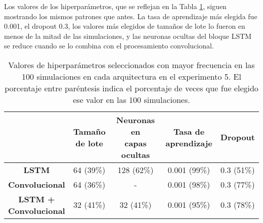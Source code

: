 \documentclass[../../main.tex]{subfiles}
\begin{document}
Los valores de los hiperparámetros, que se reflejan en la Tabla
\ref{tab:hyperparams_exp5}, siguen mostrando los mismos patrones que antes. La tasa de
aprendizaje más elegida fue 0.001, el dropout 0.3, los valores más elegidos de tamaños de
lote lo fueron en menos de la mitad de las simulaciones, y las neuronas ocultas del bloque
LSTM se reduce cuando se lo combina con el procesamiento convolucional.

\begin{table}[H]
    \centering
    \renewcommand{\arraystretch}{1.2}
    \begin{tabular}{|c|c|c|c|c|}
        \hline
            & \makecell{\textbf{Tamaño}\\\textbf{de lote}}
            & \makecell{\textbf{Neuronas en}\\\textbf{capas ocultas}}
            & \makecell{\textbf{Tasa de}\\\textbf{aprendizaje}}
            & \textbf{Dropout} \\ \hline\hline
        \textbf{LSTM}
            & 64 (39\%) & 128 (62\%) & 0.001 (99\%) & 0.3 (51\%) \\ \hline
        \textbf{Convolucional}
            & 64 (36\%) & -          & 0.001 (98\%) & 0.3 (77\%) \\ \hline
        \makecell{\textbf{LSTM +}\\\textbf{Convolucional}}
            & 32 (41\%) & 32 (41\%)  & 0.001 (95\%) & 0.3 (78\%) \\
        \hline
    \end{tabular}
    \caption{Valores de hiperparámetros seleccionados con mayor frecuencia en las 100
    simulaciones en cada arquitectura en el experimento 5. El porcentaje entre paréntesis
    indica el porcentaje de veces que fue elegido ese valor en las 100 simulaciones.}
    \label{tab:hyperparams_exp5}
\end{table}
\end{document}
